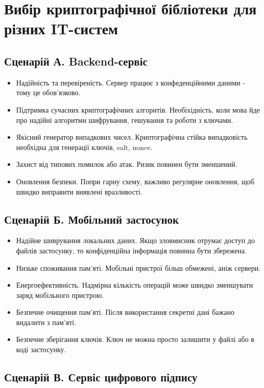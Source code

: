 \section{Вибір криптографічної бібліотеки для різних IT-систем}

\subsection{Сценарій А. Backend-сервіс}

\begin{itemize}
    \item Надійність та перевіреність. Сервер працює з конфеденційними даними - тому це обов'язково.
    \item Підтримка сучасних криптографічних алгоритів. Необіхідність, коли мова йде про надійні алгоритми шифрування, гешування та роботи з ключами.
    \item Якісний генератор випадкових чисел. Криптографічна стійка випадковість необхідна для генерації ключів, salt, nonce.
    \item Захист від типових помилок або атак. Ризик повинен бути зменшений.
    \item Оновлення безпеки. Попри гарну схему, важливо регулярне оновлення, щоб швидко виправити виявлені вразливості.
\end{itemize}

\subsection{Сценарій Б. Мобільний застосунок}

\begin{itemize}
    \item Надійне шиврування локальних даних. Якщо зловмисник отрумає доступ до файлів застосунку, то конфіденційна інформація повинна бути збережена.
    \item Низьке споживання пам'яті. Мобільні пристрої більш обмежені, аніж сервери.
    \item Енергоефективність. Надмірна кількість операцій може швидко зменшувати заряд мобільного пристрою.
    \item Безпечне очищення пам'яті. Після використання секретні дані бажано видалити з пам'яті.
    \item Безпечне зберігання ключів. Ключ не можна просто залишити у файлі або в коді застосунку.
\end{itemize}


\subsection{Сценарій В. Сервіс цифрового підпису}

